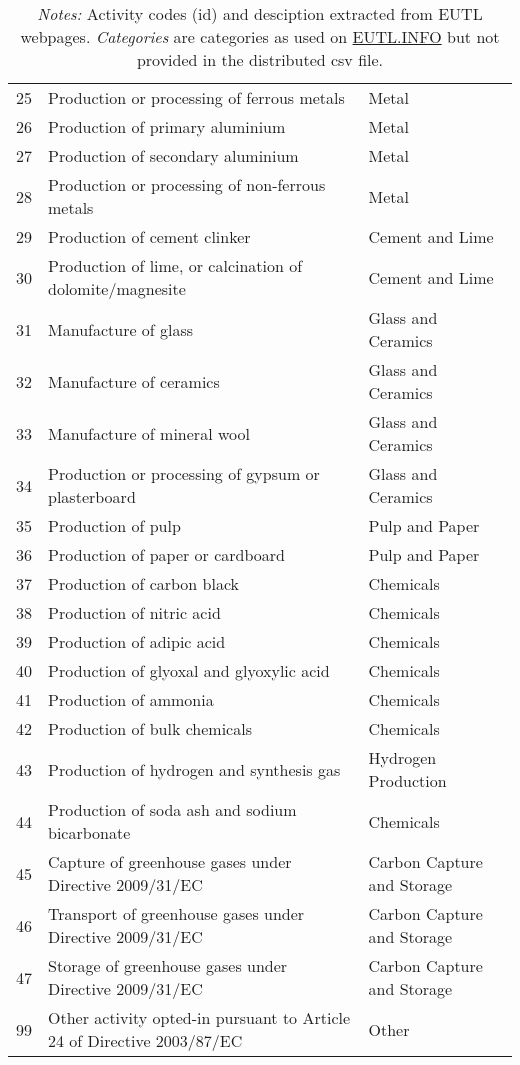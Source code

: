 \documentclass[authoryear]{elsarticle}
\begin{document}
\begin{table}[htbp]
\begin{tabular*}{\textwidth}{@{}@{\extracolsep{\fill}} lp{30.18em}l @{}}
		25    & Production or processing of ferrous metals & Metal \\
		26    & Production of primary aluminium & Metal \\
		27    & Production of secondary aluminium & Metal \\
		28    & Production or processing of non-ferrous metals & Metal \\
		29    & Production of cement clinker & Cement and Lime \\
		30    & Production of lime, or calcination of dolomite/magnesite & Cement and Lime \\
		31    & Manufacture of glass & Glass and Ceramics \\
		32    & Manufacture of ceramics & Glass and Ceramics \\
		33    & Manufacture of mineral wool & Glass and Ceramics \\
		34    & Production or processing of gypsum or plasterboard & Glass and Ceramics \\
		35    & Production of pulp & Pulp and Paper \\
		36    & Production of paper or cardboard & Pulp and Paper \\
		37    & Production of carbon black & Chemicals \\
		38    & Production of nitric acid & Chemicals \\
		39    & Production of adipic acid & Chemicals \\
		40    & Production of glyoxal and glyoxylic acid & Chemicals \\
		41    & Production of ammonia & Chemicals \\
		42    & Production of bulk chemicals & Chemicals \\
		43    & Production of hydrogen and synthesis gas & Hydrogen Production \\
		44    & Production of soda ash and sodium bicarbonate & Chemicals \\
		45    & Capture of greenhouse gases under Directive 2009/31/EC & Carbon Capture and Storage \\
		46    & Transport of greenhouse gases under Directive 2009/31/EC & Carbon Capture and Storage \\
		47    & Storage of greenhouse gases under Directive 2009/31/EC & Carbon Capture and Storage \\
		99	  & Other activity opted-in pursuant to Article 24 of Directive 2003/87/EC&	Other\\
		\bottomrule
		\bottomrule
	\end{tabular*}%
	\vspace{0ex}
	\caption*{\footnotesize \emph{Notes:} Activity codes (id) and desciption extracted from EUTL webpages. \emph{Categories} are categories as used on \href{https://euets.info}{EUTL.INFO} but not provided in the distributed csv file.}
	\vspace{0ex}
\end{table}%
\end{document}
